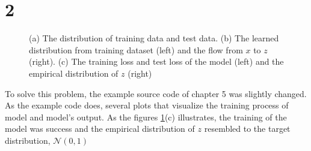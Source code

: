 \documentclass[10pt]{article}
\begin{document}
\section*{2}
\begin{figure}[!h]
    \begin{center}
    \end{center}
    \caption{(a) The distribution of training data and test data. (b) The learned distribution from training dataset (left) and the flow from $x$ to $z$ (right). (c) The training loss and test loss of the model (left) and the empirical distribution of $z$ (right)}
    \label{fig2}
\end{figure}

To solve this problem, the example source code of chapter 5 was slightly changed.
As the example code does, several plots that visualize the training process of model and model's output. 
As the figures \ref{fig2}(c) illustrates, the training of the model was success and the empirical distribution of $z$ resembled to the target distribution, $\mathcal{N}(0,1)$
\clearpage
\end{document}
